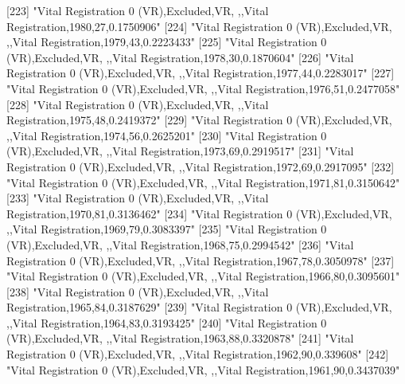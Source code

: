 [223] "Vital Registration 0 (VR),Excluded,VR, ,,Vital Registration,1980,27,0.1750906"                                                
[224] "Vital Registration 0 (VR),Excluded,VR, ,,Vital Registration,1979,43,0.2223433"                                                
[225] "Vital Registration 0 (VR),Excluded,VR, ,,Vital Registration,1978,30,0.1870604"                                                
[226] "Vital Registration 0 (VR),Excluded,VR, ,,Vital Registration,1977,44,0.2283017"                                                
[227] "Vital Registration 0 (VR),Excluded,VR, ,,Vital Registration,1976,51,0.2477058"                                                
[228] "Vital Registration 0 (VR),Excluded,VR, ,,Vital Registration,1975,48,0.2419372"                                                
[229] "Vital Registration 0 (VR),Excluded,VR, ,,Vital Registration,1974,56,0.2625201"                                                
[230] "Vital Registration 0 (VR),Excluded,VR, ,,Vital Registration,1973,69,0.2919517"                                                
[231] "Vital Registration 0 (VR),Excluded,VR, ,,Vital Registration,1972,69,0.2917095"                                                
[232] "Vital Registration 0 (VR),Excluded,VR, ,,Vital Registration,1971,81,0.3150642"                                                
[233] "Vital Registration 0 (VR),Excluded,VR, ,,Vital Registration,1970,81,0.3136462"                                                
[234] "Vital Registration 0 (VR),Excluded,VR, ,,Vital Registration,1969,79,0.3083397"                                                
[235] "Vital Registration 0 (VR),Excluded,VR, ,,Vital Registration,1968,75,0.2994542"                                                
[236] "Vital Registration 0 (VR),Excluded,VR, ,,Vital Registration,1967,78,0.3050978"                                                
[237] "Vital Registration 0 (VR),Excluded,VR, ,,Vital Registration,1966,80,0.3095601"                                                
[238] "Vital Registration 0 (VR),Excluded,VR, ,,Vital Registration,1965,84,0.3187629"                                                
[239] "Vital Registration 0 (VR),Excluded,VR, ,,Vital Registration,1964,83,0.3193425"                                                
[240] "Vital Registration 0 (VR),Excluded,VR, ,,Vital Registration,1963,88,0.3320878"                                                
[241] "Vital Registration 0 (VR),Excluded,VR, ,,Vital Registration,1962,90,0.339608"                                                 
[242] "Vital Registration 0 (VR),Excluded,VR, ,,Vital Registration,1961,90,0.3437039"                                                
